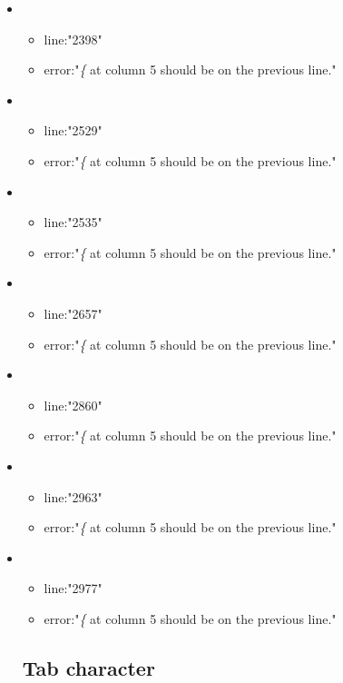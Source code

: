 \begin{itemize}
\begin{itemize}
	\end{itemize}
	\item 
	\begin{itemize} 
		\item line:"2398" 
		\item error:"\emph{\{} at column 5 should be on the previous line." 
	\end{itemize}
	\item 
	\begin{itemize} 
		\item line:"2529" 
		\item error:"\emph{\{} at column 5 should be on the previous line." 
	\end{itemize}
	\item 
	\begin{itemize} 
		\item line:"2535" 
		\item error:"\emph{\{} at column 5 should be on the previous line." 
	\end{itemize}
	\item 
	\begin{itemize} 
		\item line:"2657" 
		\item error:"\emph{\{} at column 5 should be on the previous line." 
	\end{itemize}
	\item 
	\begin{itemize} 
		\item line:"2860" 
		\item error:"\emph{\{} at column 5 should be on the previous line." 
	\end{itemize}
	\item 
	\begin{itemize} 
		\item line:"2963" 
		\item error:"\emph{\{} at column 5 should be on the previous line." 
	\end{itemize}
	\item 
	\begin{itemize} 
		\item line:"2977" 
		\item error:"\emph{\{} at column 5 should be on the previous line." 
	\end{itemize}
\subsection{Tab character} %
\label{sub:tab}



\end{itemize}
